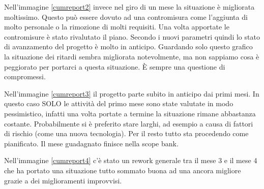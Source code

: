 \noindent Nell'immagine \ref{cumreport2} invece nel giro di un mese la situazione è migliorata moltissimo. Questo può essere dovuto ad una contromisura come l'aggiunta di molto personale o la rimozione di molti requisiti. Una volta apportate le contromisure è stato rivalutato il piano. Secondo i nuovi parametri quindi lo stato di avanzamento del progetto è molto in anticipo. Guardando solo questo grafico la situazione dei ritardi sembra migliorata notevolmente, ma non sappiamo cosa è peggiorato per portarci a questa situazione. È sempre una questione di compromessi.\newline

\noindent Nell'immagine \ref{cumreport3} il progetto parte subito in anticipo dai primi mesi. In questo caso SOLO le attività del primo mese sono state valutate in modo pessimistico, infatti una volta portate a termine la situazione rimane abbastanza costante. Probabilmente si è preferito stare larghi, ad esempio a causa di fattori di rischio (come una nuova tecnologia). Per il resto tutto sta procedendo come pianificato. Il mese guadagnato finisce nella scope bank.\newline

\noindent Nell'immagine \ref{cumreport4} c'è stato un rework generale tra il mese 3 e il mese 4 che ha portato una situazione tutto sommato buona ad una ancora migliore grazie a dei miglioramenti improvvisi.

